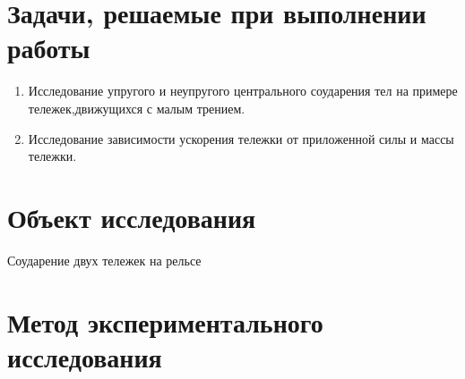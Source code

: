 \documentclass[20pt]{article}
\begin{document}
\section{Задачи, решаемые при выполнении работы}
\begin{enumerate}
    \item Исследование упругого и неупругого центрального соударения тел на примере тележек,движущихся с малым трением.
    \item Исследование зависимости ускорения тележки от приложенной силы и массы тележки.
\end{enumerate}

\section{Объект исследования}
Соударение двух тележек на рельсе

\section{Метод экспериментального исследования}
\end{document}
